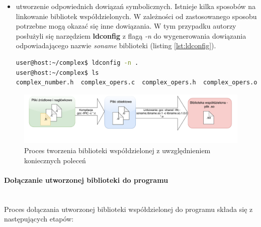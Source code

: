 \begin{itemize}
\item utworzenie odpowiednich dowiązań symbolicznych. Istnieje kilka sposobów na linkowanie bibliotek współdzielonych. W zależności od zastosowanego sposobu potrzebne mogą okazać się inne dowiązania. W tym przypadku autorzy posłużyli się narzędziem \textbf{ldconfig} z flagą \textit{-n} do wygenerowania dowiązania odpowiadającego nazwie \textit{soname} biblioteki (listing \ref{lst:ldconfig}).

\begin{lstlisting}[language=bash, style=Cmd, caption={Utworzenie dowiązania symbolicznego wskazującego na bibliotekę za pomocą programu \textit{ldcongfig}}, label={lst:ldconfig}]
user@host:~/complex$ ldconfig -n .
user@host:~/complex$ ls
complex_number.h  complex_opers.c  complex_opers.h  complex_opers.o  libcoml.so.1  libcoml.so.1.0.0
\end{lstlisting}

\end{itemize}

\begin{figure}[H]
\centering
\caption{Proces tworzenia biblioteki współdzielonej z uwzględnieniem koniecznych poleceń \cite{Compiling}}
\label{fig:sharedCreate}
\includegraphics[width=\textwidth]{res/sharedLibFlow}
\end{figure}


\paragraph*{Dołączanie utworzonej biblioteki do programu}\mbox{}\\
Proces dołączania utworzonej biblioteki współdzielonej do programu składa się z następujących etapów:

